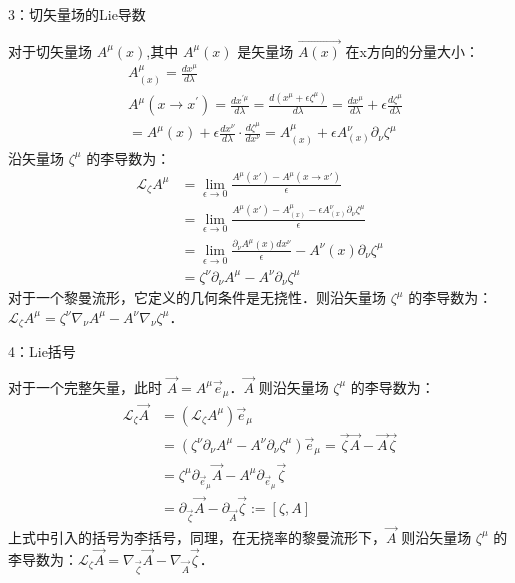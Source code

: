 3：切矢量场的Lie导数

对于切矢量场 $A^{\mu}(x)$,其中 $A^{\mu}(x)$ 是矢量场 $\overrightarrow{A(x)}$ 在x方向的分量大小：
$$\begin{aligned}
&A^{\mu}_{(x)}=\frac{d x^{\mu}}{d \lambda}\\
&A^{\mu}\left(x \rightarrow x^{\prime}\right)=\frac{d x^{\prime \mu}}{d \lambda}=\frac{d\left(x^{\mu}+\epsilon \zeta^{\mu}\right)}{d \lambda}=\frac{d x^{\mu}}{d \lambda}+\epsilon\frac{d \zeta^{\mu}}{d \lambda} \\
&=A^{\mu}(x)+\epsilon \frac{d x^{\nu}}{d \lambda} \cdot \frac{d \zeta^{\mu}}{dx^{\nu}} =A^{\mu}_{(x)}+\epsilon A_{(x)}^{\nu}\partial_{\nu}\zeta^{\mu}
\end{aligned}$$
沿矢量场 $\zeta^{\mu}$ 的李导数为：
$$\begin{aligned}
\mathcal{L}_{\zeta} A^{\mu} &=\lim _{\epsilon \rightarrow 0} \frac{A^{\mu}(x')-A^{\mu}(x \rightarrow x')}{\epsilon} \\
&=\lim _{\epsilon \rightarrow 0} \frac{A^{\mu}(x')-A^{\mu}_{(x)}-\epsilon A_{(x)}^{\nu}\partial_{\nu}\zeta^{\mu}}{\epsilon} \\
&=\lim _{\epsilon \rightarrow 0} \frac{\partial_{\nu} A^{\mu}(x) d x^{\nu}}{\epsilon}-A^{\nu}(x) \partial_{\nu} \zeta^{\mu} \\
&=\zeta^{\nu} \partial_{\nu} A^{\mu}-A^{\nu} \partial_{\nu} \zeta^{\mu}
\end{aligned}$$
对于一个黎曼流形，它定义的几何条件是无挠性．则沿矢量场 $\zeta^{\mu}$ 的李导数为：$\mathcal{L}_{\zeta} A^{\mu}=\zeta^{\nu} \nabla_{\nu} A^{\mu}-A^{\nu} \nabla_{\nu} \zeta^{\mu}$．

 4：Lie括号

对于一个完整矢量，此时 $\overrightarrow{A}=A^{\mu}\overrightarrow{e}_{\mu}$．$\overrightarrow{A}$ 则沿矢量场 $\zeta^{\mu}$ 的李导数为：
$$\begin{aligned}
\mathcal{L}_{\zeta} \overrightarrow{A} &=\left(\mathcal{L}_{\zeta} A^{\mu}\right)\overrightarrow{e}_{\mu}  \\
&=\left(\zeta^{\nu} \partial_{\nu} A^{\mu}-A^{\nu} \partial_{\nu} \zeta^{\mu}\right) \overrightarrow{e}_{\mu} =\overrightarrow{\zeta} \overrightarrow{A}-\overrightarrow{A} \overrightarrow{\zeta} \\
&=\zeta^{\mu} \partial_{\overrightarrow{e}_{\mu}} \overrightarrow{A}-A^{\mu} \partial_{\overrightarrow{e}_{\mu}} \overrightarrow{\zeta}\\
&=\partial_{\overrightarrow{\zeta}} \overrightarrow{A}-\partial_{\overrightarrow{A}} \overrightarrow{\zeta}:=[\zeta, A]
\end{aligned}$$
上式中引入的括号为李括号，同理，在无挠率的黎曼流形下，$\overrightarrow{A}$ 则沿矢量场 $\zeta^{\mu}$ 的李导数为：$\mathcal{L}_{\zeta} \overrightarrow{A}=\nabla_{\overrightarrow{\zeta}} \overrightarrow{A}-\nabla_{\overrightarrow{A}} \overrightarrow{\zeta}$．

